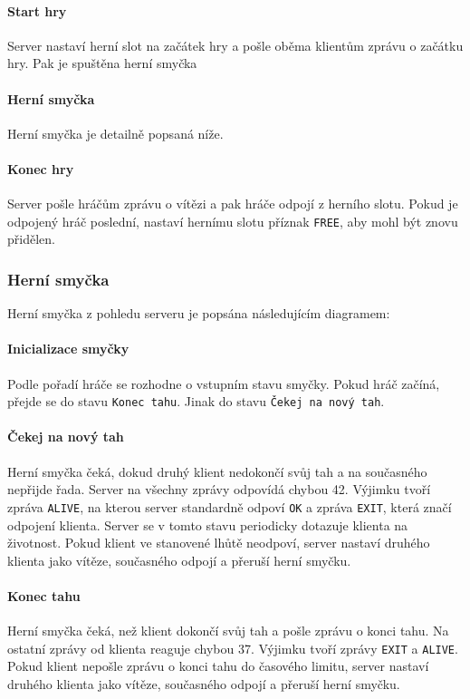 \documentclass[11pt,a4paper]{scrartcl}
\begin{document}
	\paragraph{Start hry}
	Server nastaví herní slot na začátek hry a pošle oběma klientům zprávu o začátku hry. Pak je spuštěna herní smyčka
	
	\paragraph{Herní smyčka}
	Herní smyčka je detailně popsaná níže.
	
	\paragraph{Konec hry}
	Server pošle hráčům zprávu o vítězi a pak hráče odpojí z herního slotu. Pokud je odpojený hráč poslední, nastaví hernímu slotu příznak \verb|FREE|, aby mohl být znovu přidělen.
	
	\subsubsection{Herní smyčka}
	Herní smyčka z pohledu serveru je popsána následujícím diagramem:
	
	\paragraph{Inicializace smyčky}
	Podle pořadí hráče se rozhodne o vstupním stavu smyčky. Pokud hráč začíná, přejde se do stavu \verb|Konec tahu|. Jinak do stavu \verb|Čekej na nový tah|.
	
	\paragraph{Čekej na nový tah}
	Herní smyčka čeká, dokud druhý klient nedokončí svůj tah a na současného nepřijde řada. Server na všechny zprávy odpovídá chybou 42. Výjimku tvoří zpráva \verb|ALIVE|, na kterou server standardně odpoví \verb|OK| a zpráva \verb|EXIT|, která značí odpojení klienta. Server se v tomto stavu periodicky dotazuje klienta na životnost. Pokud klient ve stanovené lhůtě neodpoví, server nastaví druhého klienta jako vítěze, současného odpojí a přeruší herní smyčku.
	
	\paragraph{Konec tahu}
	Herní smyčka čeká, než klient dokončí svůj tah a pošle zprávu o konci tahu. Na ostatní zprávy od klienta reaguje chybou 37. Výjimku tvoří zprávy \verb|EXIT| a \verb|ALIVE|. Pokud klient nepošle zprávu o konci tahu do časového limitu, server nastaví druhého klienta jako vítěze, současného odpojí a přeruší herní smyčku.
	
\end{document}
